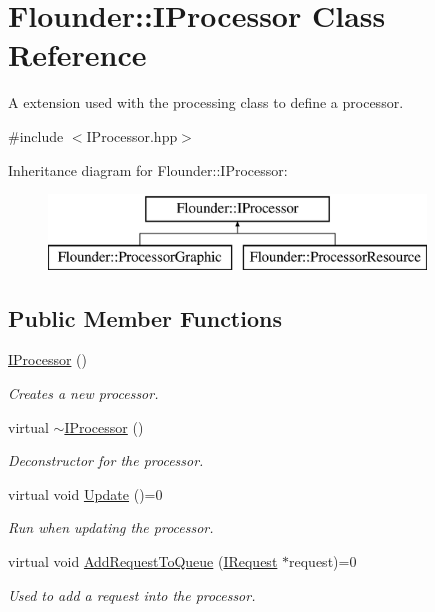 \hypertarget{class_flounder_1_1_i_processor}{}\section{Flounder\+:\+:I\+Processor Class Reference}
\label{class_flounder_1_1_i_processor}


A extension used with the processing class to define a processor.  




{\ttfamily \#include $<$I\+Processor.\+hpp$>$}

Inheritance diagram for Flounder\+:\+:I\+Processor\+:\begin{figure}[H]
\begin{center}
\leavevmode
\includegraphics[height=2.000000cm]{class_flounder_1_1_i_processor}
\end{center}
\end{figure}
\subsection*{Public Member Functions}
\begin{DoxyCompactItemize}
\item 
\hyperlink{class_flounder_1_1_i_processor_a188f027950354063be0f78b5298729e9}{I\+Processor} ()
\begin{DoxyCompactList}\small\item\em Creates a new processor. \end{DoxyCompactList}\item 
virtual \hyperlink{class_flounder_1_1_i_processor_ad5e6323fe51d4dfe32b5c2249511ff0b}{$\sim$\+I\+Processor} ()
\begin{DoxyCompactList}\small\item\em Deconstructor for the processor. \end{DoxyCompactList}\item 
virtual void \hyperlink{class_flounder_1_1_i_processor_ade1b8614d9e1b62ad66887426701a5d4}{Update} ()=0
\begin{DoxyCompactList}\small\item\em Run when updating the processor. \end{DoxyCompactList}\item 
virtual void \hyperlink{class_flounder_1_1_i_processor_a147a68665ac362d33f5de7740279d224}{Add\+Request\+To\+Queue} (\hyperlink{class_flounder_1_1_i_request}{I\+Request} $\ast$request)=0
\begin{DoxyCompactList}\small\item\em Used to add a request into the processor. \end{DoxyCompactList}\end{DoxyCompactItemize}


